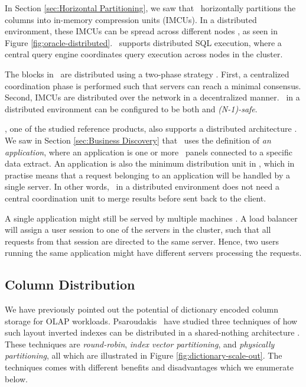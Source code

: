 In Section \ref{sec:Horizontal Partitioning}, we saw that \oracle~horizontally partitions the columns into in-memory compression units (IMCUs). In a distributed environment, these IMCUs can be spread across different nodes \cite{Mukherjee2015-ul}, as seen in Figure \ref{fig:oracle-distributed}. \oracle~supports distributed SQL execution, where a central query engine coordinates query execution across nodes in the cluster. 

The blocks in \oracle~are distributed using a two-phase strategy \cite{Mukherjee2015-ul}. First, a centralized coordination phase is performed such that servers can reach a minimal consensus. Second, IMCUs are distributed over the network in a decentralized manner. \oracle~in a distributed environment can be configured to be both  and \textit{(N-1)-safe}.

\qlikview, one of the studied reference products, also supports a distributed architecture \cite{Qlik2012-ku}. We saw in Section \ref{sec:Business Discovery} that \qlikview~uses the definition of \textit{an application}, where an application is one or more \bd~panels connected to a specific data extract. An application is also the minimum distribution unit in \qlikview, which in practise means that a request belonging to an application will be handled by a single server.  In other words, \qlikview~in a distributed environment does not need a central coordination unit to merge results before sent back to the client.

A single application might still be served by multiple machines \cite{Qlik2012-ku}. A load balancer will assign a user session to one of the servers in the cluster, such that all requests from that session are directed to the same server. Hence, two users running the same application might have different servers processing the requests.

\subsection{Column Distribution}
\label{sub:Column Distribution}
We have previously pointed out the potential of dictionary encoded column storage for OLAP workloads. Psaroudakis \ea~have studied three techniques of how such layout inverted indexes can be distributed in a shared-nothing architecture \cite{Psaroudakis2015-lc}. These techniques are \textit{round-robin}, \textit{index vector partitioning}, and \textit{physically partitioning}, all which are illustrated in Figure \ref{fig:dictionary-scale-out}. The techniques comes with different benefits and disadvantages which we enumerate below.

